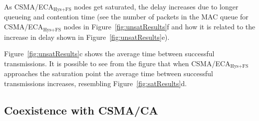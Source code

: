 	As CSMA/ECA$_{\text{Hys+FS}}$ nodes get saturated, the delay increases due to longer queueing and contention time (see the number of packets in the MAC queue for CSMA/ECA$_{\text{Hys+FS}}$ nodes in Figure~\ref{fig:unsatResults}f and how it is related to the increase in delay shown in Figure~\ref{fig:unsatResults}e).
	
	
	Figure~\ref{fig:unsatResults}c shows the average time between successful transmissions. It is possible to see from the figure that when CSMA/ECA$_{\text{Hys+FS}}$ approaches the saturation point the average time between successful transmissions increases, resembling Figure~\ref{fig:satResults}d. 
	
	
%	
	
	\subsection{Coexistence with CSMA/CA}\label{coexistance-w-csmaca}
	
